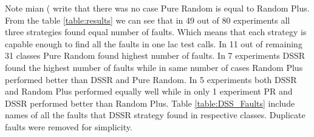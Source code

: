 \documentclass[conference]{IEEEtran}
\begin{document}
Note mian ( write that there was no case Pure Random is equal to Random Plus.\\


From the table \ref{table:results} we can see that in 49 out of 80 experiments all three strategies found equal number of faults. Which means that each strategy is capable enough to find all the faults in one lac test calls. In 11 out of remaining 31 classes Pure Random found highest number of faults. In 7 experiments DSSR found the highest number of faults while in same number of cases Random Plus performed better than DSSR and Pure Random. In 5 experiments both DSSR and Random Plus performed equally well while in only 1 experiment PR and DSSR performed better than Random Plus. 
Table \ref{table:DSS_Faults} include names of all the faults that DSSR strategy found in respective classes. Duplicate faults were removed for simplicity.




\end{document}
